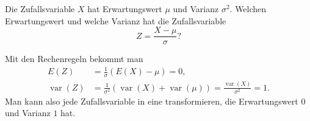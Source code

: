 Die Zufallsvariable $X$ hat Erwartungswert $\mu$ und Varianz $\sigma^2$.
Welchen Erwartungswert und welche Varianz hat die Zufallsvariable
\[
Z=\frac{X-\mu}{\sigma}?
\]


\begin{loesung}
Mit den Rechenregeln bekommt man
\begin{align*}
E(Z)&=
\frac1{\sigma}(E(X)-\mu)=0,\\
\operatorname{var}(Z)&=
\frac1{\sigma^2}(\operatorname{var}(X)+\operatorname{var}(\mu))
=
\frac{\operatorname{var}(X)}{\sigma^2}=1.
\end{align*}
Man kann also jede Zufallsvariable in eine transformieren, die Erwartungswert $0$
und Varianz $1$ hat.
\end{loesung}

